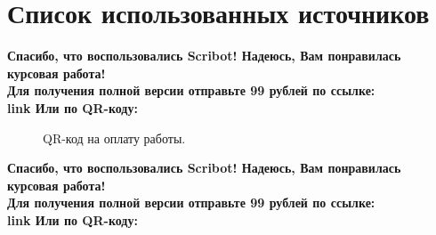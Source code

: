 \documentclass{article}
\begin{document}
\section{Список использованных источников}
\begin{center}
    \textbf{
        Спасибо, что воспользовались Scribot! Надеюсь, Вам понравилась курсовая работа!\\
        Для получения полной версии отправьте 99 рублей по ссылке:\\
        link
        Или по QR-коду:\\
    }
\end{center}
\begin{figure}[h]
    \caption{QR-код на оплату работы.}
    \label{ris:image}
\end{figure}
\newpage
\begin{center}
    \textbf{
        Спасибо, что воспользовались Scribot! Надеюсь, Вам понравилась курсовая работа!\\
        Для получения полной версии отправьте 99 рублей по ссылке:\\
        link
        Или по QR-коду:\\
    }
\end{center}
\end{document}

